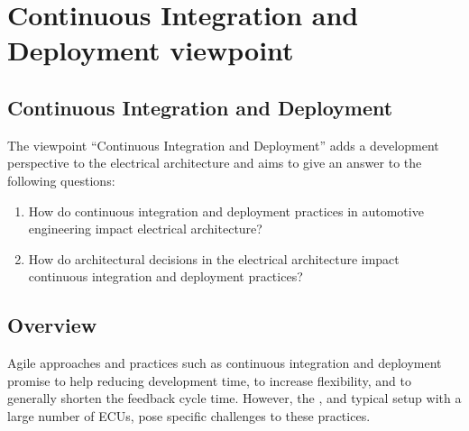 
\section{Continuous Integration and Deployment viewpoint}\label{sec:CID_VP}
\renewcommand{\Fillin}[1]{{Continuous Integration and Deployment}}
\subsection{\Fillin{Viewpoint Name}}\label{vp:template}



The viewpoint ``Continuous Integration and Deployment'' adds a development perspective to the electrical architecture and aims to give an answer to the following questions:
\begin{enumerate}
\item How do continuous integration and deployment practices in automotive engineering impact electrical architecture?
\item How do architectural decisions in the electrical architecture impact continuous integration and deployment practices?
\end{enumerate}

\subsection{Overview} 

Agile approaches and practices such as continuous integration and deployment promise to help reducing development time, to increase flexibility, and to generally shorten the feedback cycle time. 
However, the  ,
and typical setup with a large number of ECUs,
pose specific challenges to %
these practices. %

